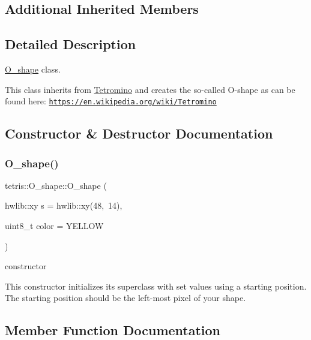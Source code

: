 \subsection*{Additional Inherited Members}


\subsection{Detailed Description}
\hyperlink{classtetris_1_1O__shape}{O\+\_\+shape} class. 

This class inherits from \hyperlink{classtetris_1_1Tetromino}{Tetromino} and creates the so-\/called O-\/shape as can be found here\+: \href{https://en.wikipedia.org/wiki/Tetromino}{\tt https\+://en.\+wikipedia.\+org/wiki/\+Tetromino} 

\subsection{Constructor \& Destructor Documentation}
\mbox{\label{classtetris_1_1O__shape_a67c89bc9c13434b8ae34427434b4fba3}} 
\subsubsection{\texorpdfstring{O\+\_\+shape()}{O\_shape()}}
{\footnotesize\ttfamily tetris\+::\+O\+\_\+shape\+::\+O\+\_\+shape (\begin{DoxyParamCaption}\item[{hwlib\+::xy}]{s = {\ttfamily hwlib\+:\+:xy(48,~14)},  }\item[{uint8\+\_\+t}]{color = {\ttfamily YELLOW} }\end{DoxyParamCaption})\hspace{0.3cm}{\ttfamily [inline]}}



constructor 

This constructor initializes its superclass with set values using a starting position. The starting position should be the left-\/most pixel of your shape. 

\subsection{Member Function Documentation}
\mbox{\label{classtetris_1_1O__shape_a92c7b336c7d3f696f24b8675ec9faed9}} 
